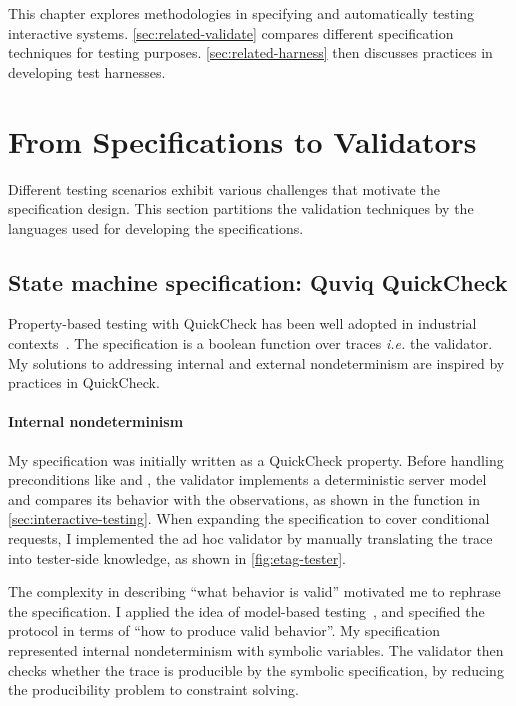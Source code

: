 This chapter explores methodologies in specifying and automatically testing
interactive systems.
\autoref{sec:related-validate} compares different specification
techniques for testing purposes.
\autoref{sec:related-harness} then discusses practices in developing test
harnesses.

\section{From Specifications to Validators}
\label{sec:related-validate}

Different testing scenarios exhibit various challenges that motivate the
specification design.  This section partitions the validation techniques by the
languages used for developing the specifications.

\subsection{State machine specification: Quviq QuickCheck}
Property-based testing with QuickCheck has been well adopted in industrial
contexts~\cite{Hughes2016}.  The specification is a boolean function over traces
{\it i.e.} the validator.  My solutions to addressing internal and external
nondeterminism are inspired by practices in QuickCheck.

\paragraph{Internal nondeterminism}
My \http specification was initially written as a QuickCheck property.  Before
handling preconditions like  and , the
validator implements a deterministic server model and compares its behavior with
the observations, as shown in the  function in
\autoref{sec:interactive-testing}.  When expanding the specification to cover
conditional requests, I implemented the ad hoc validator by manually translating
the trace into tester-side knowledge, as shown in \autoref{fig:etag-tester}.

The complexity in describing ``what behavior is valid'' motivated me to rephrase
the specification.  I applied the idea of model-based
testing~\cite{broy2005model}, and specified the protocol in terms of ``how to
produce valid behavior''.  My specification represented internal nondeterminism
with symbolic variables.  The validator then checks whether the trace is
producible by the symbolic specification, by reducing the producibility problem
to constraint solving.

